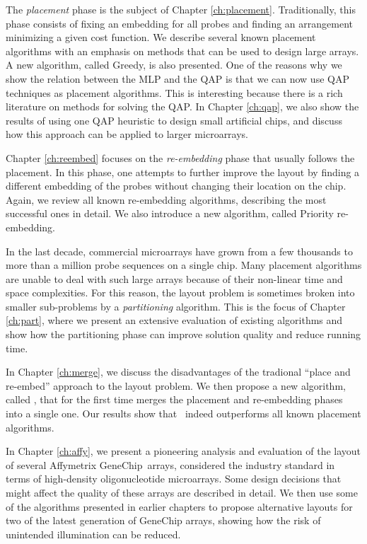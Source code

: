 The \emph{placement} phase is the subject of Chapter \ref{ch:placement}.
Traditionally, this phase consists of fixing an embedding for all probes and
finding an arrangement minimizing a given cost function. We describe several
known placement algorithms with an emphasis on methods that can be used to
design large arrays. A new algorithm, called Greedy, is also presented. One of
the reasons why we show the relation between the MLP and the QAP is that we can
now use QAP techniques as placement algorithms. This is interesting because
there is a rich literature on methods for solving the QAP. In Chapter
\ref{ch:qap}, we also show the results of using one QAP heuristic to design
small artificial chips, and discuss how this approach can be applied to larger
microarrays.

Chapter \ref{ch:reembed} focuses on the \emph{re-embedding} phase that usually
follows the placement. In this phase, one attempts to further improve the layout
by finding a different embedding of the probes without changing their location
on the chip. Again, we review all known re-embedding algorithms, describing the
most successful ones in detail. We also introduce a new algorithm, called
Priority re-embedding.

In the last decade, commercial microarrays have grown from a few thousands to
more than a million probe sequences on a single chip. Many placement algorithms
are unable to deal with such large arrays because of their non-linear time and
space complexities. For this reason, the layout problem is sometimes broken into
smaller sub-problems by a \emph{partitioning} algorithm. This is the focus of
Chapter \ref{ch:part}, where we present an extensive evaluation of existing
algorithms and show how the partitioning phase can improve solution quality and
reduce running time.

In Chapter \ref{ch:merge}, we discuss the disadvantages of the tradional ``place
and re-embed'' approach to the layout problem. We then propose a new algorithm,
called \Greedyplus, that for the first time merges the placement and re-embedding
phases into a single one. Our results show that \Greedyplus\ indeed outperforms
all known placement algorithms.

In Chapter \ref{ch:affy}, we present a pioneering analysis and evaluation of the
layout of several Affymetrix GeneChip\textR\ arrays, considered the industry
standard in terms of high-density oligonucleotide microarrays. Some design
decisions that might affect the quality of these arrays are described in detail.
We then use some of the algorithms presented in earlier chapters to propose
alternative layouts for two of the latest generation of GeneChip arrays, showing
how the risk of unintended illumination can be reduced.

